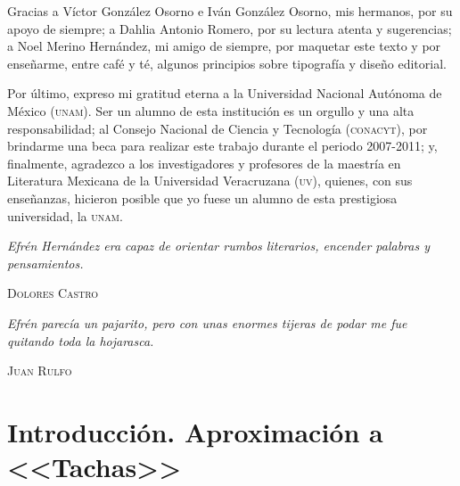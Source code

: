 \documentclass[14pt,twoside,final]{extbook} %
\begin{document}
Gracias a Víctor González Osorno e Iván González Osorno, mis hermanos, por su apoyo de siempre; a Dahlia Antonio Romero, por su lectura atenta y sugerencias; a Noel Merino Hernández, mi amigo de siempre, por maquetar este texto y por enseñarme, entre café y té, algunos principios sobre tipografía y diseño editorial.

Por último, expreso mi gratitud eterna a la Universidad Nacional Autónoma de México (\textsc{unam}). Ser un alumno de esta institución es un orgullo y una alta responsabilidad; al Consejo Nacional de Ciencia y Tecnología (\textsc{conacyt}), por brindarme una beca para realizar este trabajo durante el periodo 2007-2011; y, finalmente, agradezco a los investigadores y profesores de la maestría en Literatura Mexicana de la Universidad Veracruzana (\textsc{uv}), quienes, con sus enseñanzas, hicieron posible que yo fuese un alumno de esta prestigiosa universidad, la \textsc{unam}.
\makeatletter
\renewcommand\@dotsep{200} %
\makeatother
\renewcommand{\contentsname}{Contenidos}
\tableofcontents
{}
\thispagestyle{empty}
\pagestyle{fancy}
\fancyhf{} %
\fancyhead[RO,LE]{\thepage}
\fancyfoot{}
\renewcommand{\headrulewidth}{0pt}
\setcounter{page}{7}
\newpage
\pagestyle{empty}
\null\vfill
\newpage
\pagestyle{empty}
\vspace*{42pt}
\begin{flushright}
\begin{minipage}{7.5cm}
\emph{Efrén Hernández era capaz de orientar rumbos literarios, encender palabras y pensamientos.}
\begin{flushright}
\textsc{Dolores Castro}
\end{flushright}
\vspace*{28pt}
\emph{Efrén parecía un pajarito, pero con unas enormes tijeras de podar me fue quitando toda la hojarasca.}
\begin{flushright}
\textsc{Juan Rulfo}
\end{flushright}
\end{minipage}
\end{flushright}
\chapter*{Introducción. Aproximación a <<Tachas>>}\label{ch:introduccion-aproximacion-a-tachas}
\thispagestyle{empty}
\pagestyle{fancy}
\fancyhf{} %
\fancyhead[RO,LE]{\textlf{\thepage}}
\renewcommand{\headrulewidth}{0pt}
\setcounter{page}{11}
\end{document}
